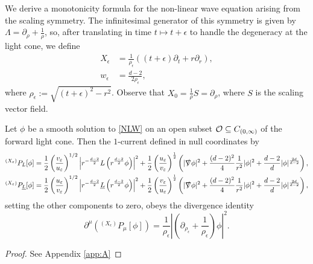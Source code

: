 We derive a monotonicity formula for the non-linear wave equation arising from the scaling symmetry. The infinitesimal generator of this symmetry is given by $\Lambda = \partial_\rho + \tfrac1\rho$, so, after translating in time $t \mapsto t + \epsilon$ to handle the degeneracy at the light cone, we define 
	\begin{align*}
		X_\epsilon
			&= \frac{1}{\rho_\epsilon} ((t + \epsilon) \partial_t + r \partial_r), \\
		w_\epsilon
			&= \frac{d - 2}{2 \rho_\epsilon},	
	\end{align*}
where $\rho_\epsilon := \sqrt{(t + \epsilon)^2 - r^2}$. Observe that $X_0 = \tfrac1\rho S = \partial_\rho$, where $S$ is the scaling vector field. 
\begin{lemma}
	Let $\phi$ be a smooth solution to \eqref{NLW} on an open subset $\cO \subseteq C_{(0, \infty)}$ of the forward light cone. Then the $1$-current defined in null coordinates by 
		\begin{align*}
			{^{(X_\epsilon)}} P_L [\phi]
				&= \frac12 \left( \frac{v_\epsilon}{u_\epsilon} \right)^{1/2} \left| r^{-\frac{d - 2}{2}} L \left( r^{\frac{d - 2}{2}} \phi \right)\right|^2 + \frac12 \left( \frac{u_\epsilon}{v_\epsilon} \right)^\frac12 \left( |\slashed \nabla \phi|^2 + \frac{(d - 2)^2}{4} \frac1{r^2} |\phi|^2 + \frac{d - 2}{d} |\phi|^{\frac{2d}{d - 2}} \right),\\
			{^{(X_\epsilon)}} P_{\underline L} [\phi]
				&= \frac12 \left( \frac{u_\epsilon}{v_\epsilon} \right)^{1/2} \left| r^{-\frac{d - 2}{2}} \underline L \left( r^{\frac{d - 2}{2}} \phi \right)\right|^2 + \frac12 \left( \frac{v_\epsilon}{u_\epsilon} \right)^\frac12 \left(  |\slashed \nabla \phi|^2 + \frac{(d - 2)^2}{4} \frac1{r^2} |\phi|^2 + \frac{d - 2}{d} |\phi|^{\frac{2d}{d - 2}}  \right),
		\end{align*}	
	setting the other components to zero, obeys the divergence identity
		\[
			\partial^\mu \left( {^{(X_\epsilon)}} P_\mu [\phi] \right) = \frac{1}{\rho_\epsilon} \left| \left( \partial_{\rho_\epsilon} + \frac1{\rho_\epsilon} \right)\phi \right|^2.
		\]	
\end{lemma}

\begin{proof}
	See Appendix \ref{app:A}
\end{proof}

